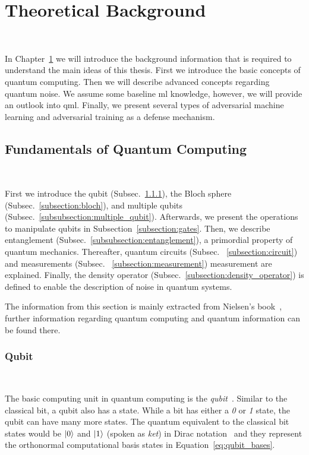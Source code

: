 \chapter{Theoretical Background}\label{chapter:background} \

In Chapter~\ref{chapter:background} we will introduce the
background information that is required to understand
the main ideas of this thesis. First we introduce
the basic concepts of quantum computing. Then we will
describe advanced concepts regarding quantum noise. We
assume some baseline \ac{ml} knowledge, however, we
will provide an outlook into \ac{qml}. Finally, we
present several types of adversarial machine learning
and adversarial training as a defense mechanism. \

\section{Fundamentals of Quantum Computing} \

First we introduce the qubit (Subsec.~\ref{subsection:qubit}),
the Bloch sphere (Subsec.~\ref{subsection:bloch}), and
multiple qubits (Subsec.~\ref{subsubsection:multiple_qubit}).
Afterwards, we present the operations to manipulate qubits in 
Subsection~\ref{subsection:gates}. Then, we describe entanglement
(Subsec.~\ref{subsubsection:entanglement}), a primordial
property of quantum mechanics. Thereafter, quantum circuits (Subsec.
~\ref{subsection:circuit}) and measurements (Subsec.
~\ref{subsection:measurement}) measurement are explained.
Finally, the density operator (Subsec.~\ref{subsection:density_operator})
is defined to enable the description of noise in quantum systems. \

The information from this section is mainly extracted from
Nielsen's book~\cite{nielsen_quantum_2010}, further information
regarding quantum computing and quantum information can be found
there. \

\subsection{Qubit}\label{subsection:qubit} \

The basic computing unit in quantum computing is the
\textit{qubit}~\cite{schumacher_quantum_1995}. Similar to the classical
bit, a qubit also has a state. While a bit has either a
\textit{0} or \textit{1} state, the qubit can have
many more states. The quantum equivalent to the classical
bit states would be \(\ket{0}\) and \(\ket{1}\) (spoken as \textit{ket}) in Dirac
notation~\cite{dirac_new_1939} and they represent the orthonormal computational
basis states in Equation~\ref{eq:qubit_bases}. \

